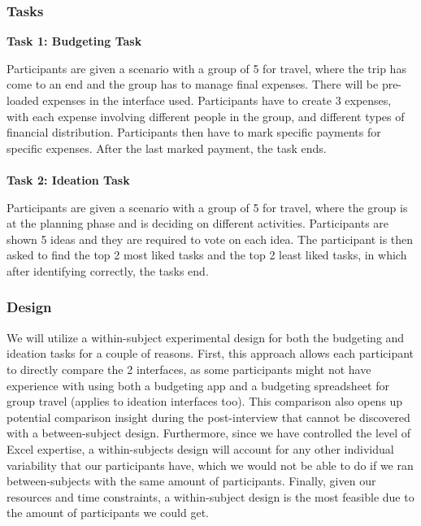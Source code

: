 \documentclass[12pt,a4paper]{article}
\begin{document}
\subsubsection{Tasks}
\textbf{Task 1: Budgeting Task}

\par
\indent
Participants are given a scenario with a group of 5 for travel, where the trip has come to an end and the group has to manage final expenses. There will be pre-loaded expenses in the interface used. Participants have to create 3 expenses, with each expense involving different people in the group, and different types of financial distribution. Participants then have to mark specific payments for specific expenses. After the last marked payment, the task ends.
\\\\
\indent \textbf{Task 2: Ideation Task}
\par
\indent
Participants are given a scenario with a group of 5 for travel, where the group is at the planning phase and is deciding on different activities. Participants are shown 5 ideas and they are required to vote on each idea. The participant is then asked to find the top 2 most liked tasks and the top 2 least liked tasks, in which after identifying correctly, the tasks end.

\subsubsection{Design}
\par
\indent
We will utilize a within-subject experimental design for both the budgeting and ideation tasks for a couple of reasons. First, this approach allows each participant to directly compare the 2 interfaces, as some participants might not have experience with using both a budgeting app and a budgeting spreadsheet for group travel (applies to ideation interfaces too). This comparison also opens up potential comparison insight during the post-interview that cannot be discovered with a between-subject design. Furthermore, since we have controlled the level of Excel expertise, a within-subjects design will account for any other individual variability that our participants have, which we would not be able to do if we ran between-subjects with the same amount of participants. Finally, given our resources and time constraints, a within-subject design is the most feasible due to the amount of participants we could get. \newline
\end{document}
